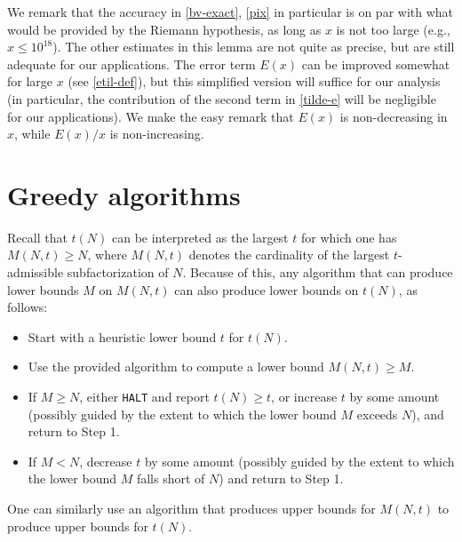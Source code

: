 \documentclass[10pt,a4paper,reqno]{amsart}
\numberwithin{equation}{section}
\theoremstyle{plain}
\theoremstyle{definition}
\begin{document}
We remark that the accuracy in \eqref{bv-exact}, \eqref{pix} in particular is on par with what would be provided by the Riemann hypothesis, as long as $x$ is not too large (e.g., $x \leq 10^{18}$).  The other estimates in this lemma are not quite as precise, but are still adequate for our applications.  The error term $E(x)$ can be improved somewhat for large $x$ (see \eqref{etil-def}), but this simplified version will suffice for our analysis (in particular, the contribution of the second term in \eqref{tilde-e} will be negligible for our applications).  We make the easy remark that $E(x)$ is non-decreasing in $x$, while $E(x)/x$ is non-increasing.

\section{Greedy algorithms}\label{greedy-sec}

Recall that $t(N)$ can be interpreted as the largest $t$ for which one has $M(N,t) \geq N$, where $M(N,t)$ denotes the cardinality of the largest $t$-admissible subfactorization of $N$. Because of this, any algorithm that can produce lower bounds $M$ on $M(N,t)$ can also produce lower bounds on $t(N)$, as follows:

\begin{itemize}
  \item[Step 0:] Start with a heuristic lower bound $t$ for $t(N)$.
  \item[Step 1:] Use the provided algorithm to compute a lower bound $M(N,t)\ge M$.
  \item[Step 2:] If $M \ge N$, either \texttt{HALT} and report $t(N)\ge t$, or increase $t$ by some amount (possibly guided by the extent to which the lower bound $M$ exceeds $N$), and return to Step 1.
  \item[Step 3:] If $M < N$, decrease $t$ by some amount (possibly guided by the extent to which the lower bound $M$ falls short of $N$) and return to Step 1.
\end{itemize}

One can similarly use an algorithm that produces upper bounds for $M(N,t)$ to produce upper bounds for $t(N)$.
\end{document}
